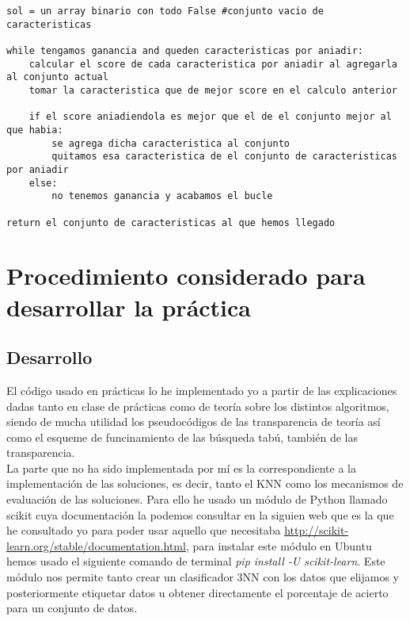 \documentclass[10pt,a4paper]{article}
\begin{document}
\begin{lstlisting}
sol = un array binario con todo False #conjunto vacio de caracteristicas

while tengamos ganancia and queden caracteristicas por aniadir:
	calcular el score de cada caracteristica por aniadir al agregarla al conjunto actual
	tomar la caracteristica que de mejor score en el calculo anterior
	
	if el score aniadiendola es mejor que el de el conjunto mejor al que habia:
		se agrega dicha caracteristica al conjunto
		quitamos esa caracteristica de el conjunto de caracteristicas por aniadir
	else:
		no tenemos ganancia y acabamos el bucle
		
return el conjunto de caracteristicas al que hemos llegado
\end{lstlisting}
\newpage
\section{\color[rgb]{0.0,0.0,0.21}Procedimiento considerado para desarrollar la práctica}

\subsection{\color[rgb]{0.0,0.0,0.51}Desarrollo}

El código usado en prácticas lo he implementado yo a partir de las explicaciones dadas tanto en clase de prácticas como de teoría sobre los distintos algoritmos, siendo de mucha utilidad los pseudocódigos de las transparencia de teoría así como el esqueme de funcinamiento de las búsqueda tabú, también de las transparencia.\\

La parte que no ha sido implementada por mí es la correspondiente a la implementación de las soluciones, es decir, tanto el KNN como los mecanismos de evaluación de las soluciones. Para ello he usado un módulo de Python llamado scikit cuya documentación la podemos consultar en la siguien web que es la que he consultado yo para poder usar aquello que necesitaba \url{http://scikit-learn.org/stable/documentation.html}, para instalar este módulo en Ubuntu hemos usado el siguiente comando de terminal \textit{pip install -U scikit-learn}. Este módulo nos permite tanto crear un clasificador 3NN con los datos que elijamos y posteriormente etiquetar datos u obtener directamente el porcentaje de acierto para un conjunto de datos.\\
\end{document}
